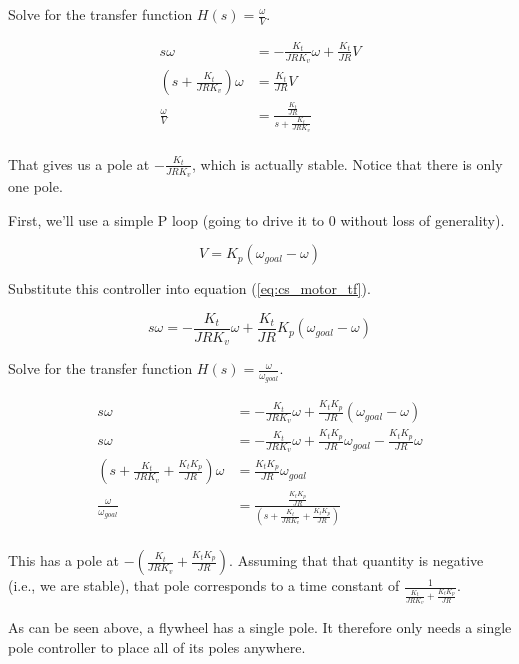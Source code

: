 Solve for the transfer function $H(s) = \frac{\omega}{V}$.

\begin{align*}
  s \omega &= -\frac{K_t}{JRK_v} \omega + \frac{K_t}{JR} V \\
  \left(s + \frac{K_t}{JRK_v}\right) \omega &= \frac{K_t}{JR} V \\
  \frac{\omega}{V} &= \frac{\frac{K_t}{JR}}{s + \frac{K_t}{JRK_v}} \\
\end{align*}

That gives us a pole at $-\frac{K_t}{JRK_v}$, which is actually stable. Notice
that there is only one pole.

First, we'll use a simple P loop (going to drive it to 0 without loss of
generality).

\begin{equation*}
  V = K_p (\omega_{goal} - \omega)
\end{equation*}

Substitute this controller into equation (\ref{eq:cs_motor_tf}).

\begin{equation*}
  s \omega = -\frac{K_t}{JRK_v} \omega + \frac{K_t}{JR} K_p (\omega_{goal} -
    \omega)
\end{equation*}

Solve for the transfer function $H(s) = \frac{\omega}{\omega_{goal}}$.

\begin{align*}
  s \omega &= -\frac{K_t}{JRK_v} \omega + \frac{K_t K_p}{JR} (\omega_{goal} -
    \omega) \\
  s \omega &= -\frac{K_t}{JRK_v} \omega + \frac{K_t K_p}{JR} \omega_{goal} -
    \frac{K_t K_p}{JR} \omega \\
  \left(s + \frac{K_t}{JRK_v} + \frac{K_t K_p}{JR}\right) \omega &=
    \frac{K_t K_p}{JR} \omega_{goal} \\
  \frac{\omega}{\omega_{goal}} &= \frac{\frac{K_t K_p}{JR}}
    {\left(s + \frac{K_t}{JRK_v} + \frac{K_t K_p}{JR}\right)} \\
\end{align*}

This has a pole at $-\left(\frac{K_t}{JRK_v} + \frac{K_t K_p}{JR}\right)$.
Assuming that that quantity is negative (i.e., we are stable), that pole
corresponds to a time constant of
$\frac{1}{\frac{K_t}{JRK_v} + \frac{K_t K_p}{JR}}$.

As can be seen above, a flywheel has a single pole. It therefore only needs a
single pole controller to place all of its poles anywhere.

